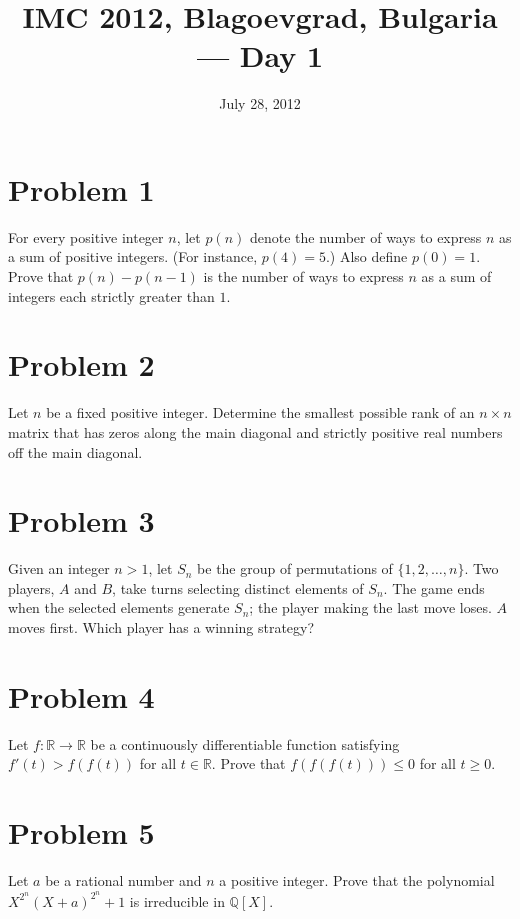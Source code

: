 \documentclass{article}
\title{IMC 2012, Blagoevgrad, Bulgaria --- Day 1}
\date{July 28, 2012}
\begin{document}
\maketitle

\section*{Problem 1}
For every positive integer $n$, let $p(n)$ denote the number of ways to express $n$ as a sum of positive integers. (For instance, $p(4) = 5$.) Also define $p(0) = 1$. Prove that $p(n) - p(n-1)$ is the number of ways to express $n$ as a sum of integers each strictly greater than $1$.

\section*{Problem 2}
Let $n$ be a fixed positive integer. Determine the smallest possible rank of an $n \times n$ matrix that has zeros along the main diagonal and strictly positive real numbers off the main diagonal.

\section*{Problem 3}
Given an integer $n > 1$, let $S_n$ be the group of permutations of $\{1, 2, \dots, n\}$. Two players, $A$ and $B$, take turns selecting distinct elements of $S_n$. The game ends when the selected elements generate $S_n$; the player making the last move loses. $A$ moves first. Which player has a winning strategy?

\section*{Problem 4}
Let $f : \mathbb{R} \to \mathbb{R}$ be a continuously differentiable function satisfying $f'(t) > f(f(t))$ for all $t \in \mathbb{R}$. Prove that $f(f(f(t))) \le 0$ for all $t \ge 0$.

\section*{Problem 5}
Let $a$ be a rational number and $n$ a positive integer. Prove that the polynomial $X^{2^n}(X+a)^{2^n} + 1$ is irreducible in $\mathbb{Q}[X]$.
\end{document}
